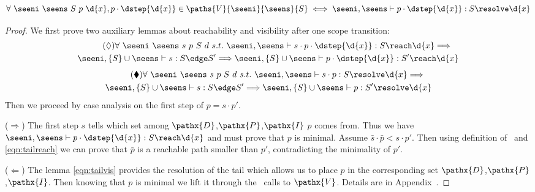 \begin{lemma} 
\label{lemma:distr}
$$\forall\ \seeni\ \seens\ S\ p\ \d{x},
 p \cdot \dstep{\d{x}}\in\paths{V}{\seeni}{\seens}{S} \iff \seeni,\seens \vdash p \cdot \dstep{\d{x}}: S \resolve \d{x}$$
\end{lemma}
\begin{proof}\vspace*{-.3\baselineskip} 
We first prove two auxiliary lemmas about reachability and visibility after one scope transition:
\vspace*{-3mm}
 \begin{multline}\label{eqn:tailreach}\tag{$\lozenge$}
   \forall\ \seeni\ \seens\ s\ p\ S\ d\ s.t.\ 
   \seeni,\seens \vdash s \cdot p\cdot\dstep{\d{x}} : S \reach \d{x} \Longrightarrow\\
   \seeni,\{S\}\cup\seens \vdash s : S \edge S' \Longrightarrow 
   \seeni,\{S\}\cup\seens \vdash p\cdot\dstep{\d{x}} : S' \reach \d{x}    
  \end{multline}\vspace*{-9mm}
\begin{multline}\label{eqn:tailvis}\tag{$\blacklozenge$}
\forall\ \seeni\ \seens\ s\ p\ S\ d\ s.t.\ 
\seeni,\seens \vdash s \cdot p : S \resolve \d{x} \Longrightarrow \\ 
\seeni,\{S\}\cup\seens \vdash s : S \edge S' \Longrightarrow 
\seeni,\{S\}\cup\seens \vdash p : S' \resolve \d{x}  
\end{multline}
Then we proceed by case analysis on the first step of $p = s\cdot p'$. 

($\Rightarrow$) The first step $s$ tells which set among $\pathx{D}$,$\pathx{P}$,$\pathx{I}$ $p$ comes from.
Thus we have $\seeni,\seens \vdash p \cdot \dstep{\d{x}}: S \reach \d{x}$ and must prove that $p$ is minimal.
Assume $\bar{s}\cdot \bar{p} < s\cdot p'$. Then using definition of \visible\ and  \ref{eqn:tailreach} we can prove that $\bar{p}$ is a reachable path smaller than $p'$, contradicting the minimality of $p'$.\medskip

($\Leftarrow$) The lemma \ref{eqn:tailvis} provides the resolution of the tail which allows us to place $p$ in
the corresponding set $\pathx{D}$,$\pathx{P}$,$\pathx{I}$. Then knowing that $p$
is minimal we lift it through the \visible\ calls to $\pathx{V}$. Details are in Appendix~\refproofappendix{}.

\end{proof}

